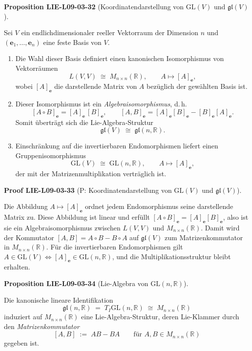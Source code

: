 \documentclass[10pt, letterpaper]{article}
\newcommand{\CustomHeading}[3]{%
  \par\medskip\noindent%
  \textbf{#1 #2} \textnormal{(#3)}.\enskip%
}
\newenvironment{PROP}[2]{\CustomHeading{Proposition}{#1}{#2}}{}
\newenvironment{PROOF}[2]{\CustomHeading{Proof}{#1}{#2}}{}
\begin{document}
\begin{PROP}{LIE-L09-03-32}{Koordinatendarstellung von $\mathrm{GL}(V)$ und $\mathfrak{gl}(V)$}
Sei $V$ ein endlichdimensionaler reeller Vektorraum der Dimension $n$ und
$(\mathbf e_1,\ldots,\mathbf e_n)$ eine feste Basis von $V$.
\begin{enumerate}
\item Die Wahl dieser Basis definiert einen kanonischen Isomorphismus von
Vektorräumen
\[
L(V,V)\;\cong\; M_{n\times n}(\mathbb R),
\qquad
A\longmapsto [A]_{\mathbf e},
\]
wobei $[A]_{\mathbf e}$ die darstellende Matrix von $A$ bezüglich der gewählten Basis ist.
\item Dieser Isomorphismus ist ein \emph{Algebraisomorphismus}, d.\,h.
\[
[A\circ B]_{\mathbf e}=[A]_{\mathbf e}\,[B]_{\mathbf e},
\qquad
[A,B]_{\mathbf e}=[A]_{\mathbf e}[B]_{\mathbf e}-[B]_{\mathbf e}[A]_{\mathbf e}.
\]
Somit überträgt sich die Lie-Algebra‐Struktur
\[
\mathfrak{gl}(V)\;\cong\;\mathfrak{gl}(n,\mathbb R).
\]
\item Einschränkung auf die invertierbaren Endomorphismen liefert einen
Gruppenisomorphismus
\[
\mathrm{GL}(V)\;\cong\;\mathrm{GL}(n,\mathbb R),
\qquad
A\longmapsto [A]_{\mathbf e},
\]
der mit der Matrizenmultiplikation verträglich ist.
\end{enumerate}
\end{PROP}

\begin{PROOF}{LIE-L09-03-33}{P: Koordinatendarstellung von $\mathrm{GL}(V)$ und $\mathfrak{gl}(V)$}
Die Abbildung $A\mapsto [A]_{\mathbf e}$ ordnet jedem Endomorphismus seine
darstellende Matrix zu. Diese Abbildung ist linear und erfüllt
$[A\circ B]_{\mathbf e}=[A]_{\mathbf e}[B]_{\mathbf e}$, also ist sie ein
Algebraisomorphismus zwischen $L(V,V)$ und $M_{n\times n}(\mathbb R)$.
Damit wird der Kommutator $[A,B]=A\circ B-B\circ A$ auf
$\mathfrak{gl}(V)$ zum Matrizenkommutator in $M_{n\times n}(\mathbb R)$.
Für die invertierbaren Endomorphismen gilt
$A\in \mathrm{GL}(V)\iff [A]_{\mathbf e}\in \mathrm{GL}(n,\mathbb R)$,
und die Multiplikationsstruktur bleibt erhalten.
\end{PROOF}

\begin{PROP}{LIE-L09-03-34}{Lie-Algebra von $\mathrm{GL}(n,\mathbb{R})$}
Die kanonische lineare Identifikation
\[
\mathfrak{gl}(n,\mathbb{R}) \;=\; T_I \mathrm{GL}(n,\mathbb{R}) 
\;\cong\; M_{n\times n}(\mathbb{R})
\]
induziert auf $M_{n\times n}(\mathbb{R})$ eine Lie-Algebra-Struktur,
deren Lie-Klammer durch den \emph{Matrizenkommutator}
\[
[A,B]\;:=\;AB-BA
\qquad
\text{für }A,B\in M_{n\times n}(\mathbb{R})
\]
gegeben ist.
\end{PROP}
\end{document}
